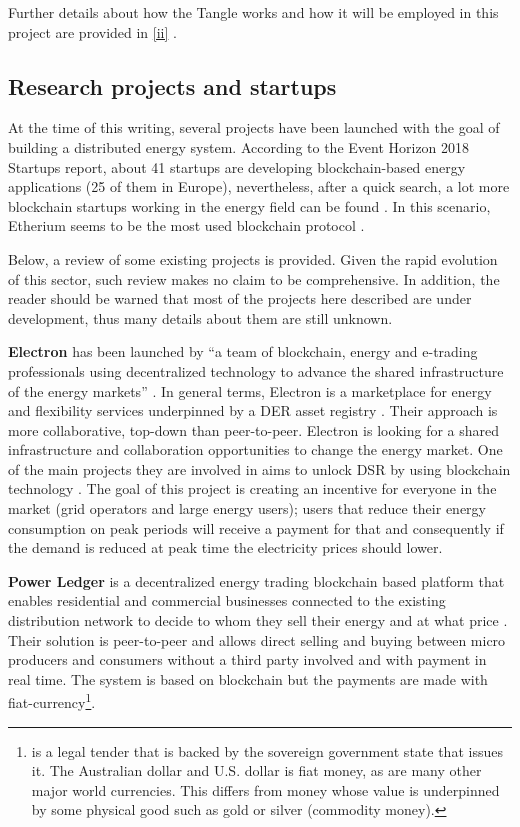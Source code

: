 Further details about how the Tangle works and how it will be employed in this project are provided in \ref{ii} . 


\subsection{Research projects and startups}


At the time of this writing, several projects have been launched with the goal of building a distributed energy system. According to the Event Horizon 2018 Startups report, about 41 startups are developing blockchain-based energy applications (25 of them in Europe), nevertheless, after a quick search, a lot more blockchain startups working in the energy field can be found \cite{EnergyBlockchainStartups}. In this scenario, Etherium seems to be the most used blockchain protocol \cite{STARTUPSWHOISWHO}.



Below, a review of some existing projects is provided. Given the rapid evolution of this sector, such review makes no claim to be comprehensive. In addition, the reader should be warned that most of the projects here described are under development, thus many details about them are still unknown. 



\textbf{Electron} has been launched by “a team of blockchain, energy and e-trading professionals using decentralized technology to advance the shared infrastructure of the energy markets” \cite{Electron}. In general terms, Electron is a marketplace for energy and flexibility services underpinned by a \ac{DER} asset registry \cite{STARTUPSWHOISWHO}.
Their approach is more collaborative, top-down than peer-to-peer. Electron is looking for a shared infrastructure and collaboration opportunities to change the energy market. One of the main projects they are involved in aims to unlock \ac{DSR} by using blockchain technology \cite{demand-sideresponse}. The goal of this project is creating an incentive for everyone in the market (grid operators and large energy users); users that reduce their energy consumption on peak periods will receive a payment for that and consequently if the demand is reduced at peak time the electricity prices should lower.



\textbf{Power Ledger} is a decentralized energy trading blockchain based platform that enables residential and commercial businesses connected to the existing distribution network to decide to whom they sell their energy and at what price \cite{STARTUPSWHOISWHO}. Their solution is peer-to-peer and allows direct selling and buying between micro producers and consumers without a third party involved and with payment in real time. The system is based on blockchain but the payments are made with fiat-currency\footnote{is a legal tender that is backed by the sovereign government state that issues it. The
Australian dollar and U.S. dollar is fiat money, as are many other major world currencies. This differs
from money whose value is underpinned by some physical good such as gold or silver (commodity
money).}.



